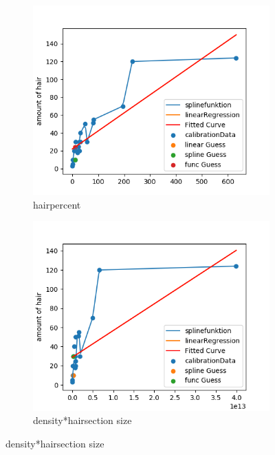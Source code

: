 \documentclass[german,a4paper, 12pt]{scrartcl}
\begin{document}
\begin{figure}[H] %
	\begin{subfigure}{0.48\textwidth}
		\includegraphics[width=1.1\linewidth]{figBina/g7.png}
		\caption{hairpercent} \label{fig:a}
	\end{subfigure}\hspace*{\fill}
	\begin{subfigure}{0.48\textwidth}
		\includegraphics[width=1.1\linewidth]{figBina/g8.png}
		\caption{density*hairsection size} \label{fig:b}
	\end{subfigure}
	

\end{figure}
\end{document}
